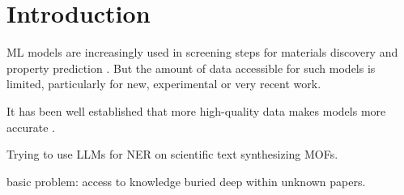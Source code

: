 \chapter{Introduction}\label{chap:introduction}


\gls{ML} models are increasingly used in screening steps for materials discovery and property prediction \cite{saal_machine_2020, luo_mof_2022, choudhary_recent_2022}. 
But the amount of data accessible for such models is limited, particularly for new, experimental or very recent work.

It has been well established that more high-quality data makes models more accurate \cite{hoffmann_empirical_2022}.

Trying to use \glspl{LLM} for \gls{NER} on scientific text synthesizing \glspl{MOF}.

basic problem: access to knowledge buried deep within unknown papers.



